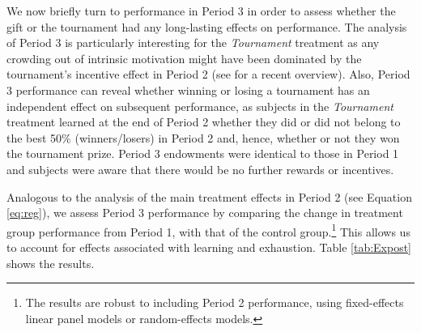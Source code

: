 We now briefly turn to performance in Period 3 in order to assess 
whether the gift or the tournament had any long-lasting effects on performance.
The analysis of Period 3 is particularly interesting for the 
\textit{Tournament} treatment as any crowding out of intrinsic motivation 
 might have been dominated by the tournament's incentive effect in Period 2 (see \citealp{bowles12JEL} for a recent overview). 
Also, Period 3 performance 
can reveal whether winning or losing a tournament has an independent  effect on subsequent 
performance, as subjects in the \textit{Tournament} 
 treatment learned at the end of Period 2 whether they did or did not belong to the best 50\% (winners/losers) 
in Period 2 and, hence, whether or not they won the tournament prize. Period 3 endowments 
were identical to those in Period 1 and subjects were aware that there would be no further rewards or incentives.

Analogous to the analysis of the main treatment effects in Period 2 (see Equation \ref{eq:reg}), we assess Period 3 performance by comparing the change in treatment group performance from Period 1, with that of the control group.\footnote{The results are robust to including Period 2 performance, using fixed-effects  linear panel models or random-effects models. } This allows us to account for effects associated with learning and exhaustion. Table \ref{tab:Expost} shows the results. 



